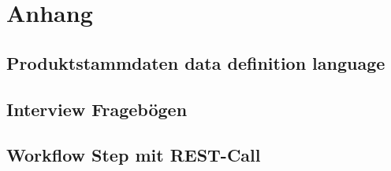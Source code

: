 \UseRawInputEncoding

\chapter{Anhang}\label{app:Anhang}

\section{Produktstammdaten data definition language}\label{app:ddl}


\section{Interview Fragebögen}\label{app:fragen}

\section{Workflow Step mit REST-Call}
\label{app:db2prov}